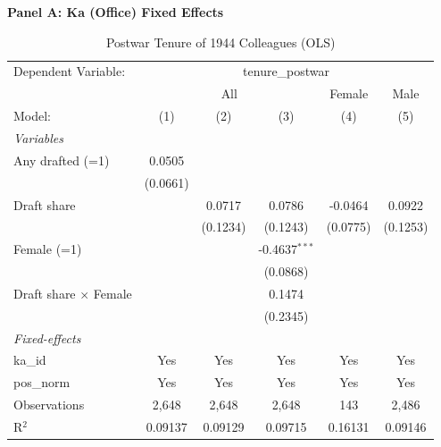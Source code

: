 \begin{table}[htbp]
\centering
\begin{threeparttable}
\caption{Postwar Tenure of 1944 Colleagues (OLS)}
\label{tab:tenure}
\small
\textbf{Panel A: Ka (Office) Fixed Effects}\\[1ex]
\begingroup
\centering
\begin{tabular}{lccccc}
   \tabularnewline \midrule \midrule
   Dependent Variable: & \multicolumn{5}{c}{tenure\_postwar}\\
    & \multicolumn{3}{c}{All} & Female & Male \\ 
   Model:                       & (1)      & (2)      & (3)             & (4)      & (5)\\  
   \midrule
   \emph{Variables}\\
   Any drafted (=1)             & 0.0505   &          &                 &          &   \\   
                                & (0.0661) &          &                 &          &   \\   
   Draft share                  &          & 0.0717   & 0.0786          & -0.0464  & 0.0922\\   
                                &          & (0.1234) & (0.1243)        & (0.0775) & (0.1253)\\   
   Female (=1)                  &          &          & -0.4637$^{***}$ &          &   \\   
                                &          &          & (0.0868)        &          &   \\   
   Draft share $\times$ Female  &          &          & 0.1474          &          &   \\   
                                &          &          & (0.2345)        &          &   \\   
   \midrule
   \emph{Fixed-effects}\\
   ka\_id                       & Yes      & Yes      & Yes             & Yes      & Yes\\  
   pos\_norm                    & Yes      & Yes      & Yes             & Yes      & Yes\\  
   \midrule
   Observations                 & 2,648    & 2,648    & 2,648           & 143      & 2,486\\  
   R$^2$                        & 0.09137  & 0.09129  & 0.09715         & 0.16131  & 0.09146\\  
   \midrule \midrule

\end{tabular}
\end{threeparttable}
\end{table}
